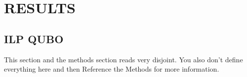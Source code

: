 \documentclass[prd,twocolumn,tightenlines,preprintnumbers,showpacs,superscriptaddress,notitlepage,nofootinbib,eqsecnum,floatfix,longbibliography,aps,10pt]{revtex4-2}
\begin{document}
\section{RESULTS}
\label{sec:results}

\subsection{ILP QUBO}
\label{sec:results:qa1}
{\color{red} This section and the methods section reads very disjoint. You also don't define everything here and then Reference the Methods for more information.}
\end{document}
